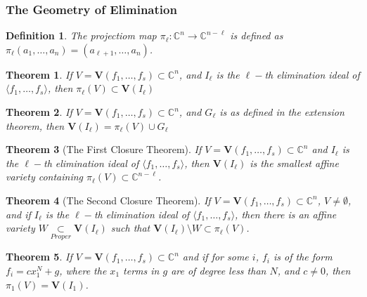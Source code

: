 \documentclass{article}
\theoremstyle{mystyle}
\newtheorem{theorem}{Theorem}[section]
\newtheorem{definition}{Definition}[section]
\begin{document}
\subsubsection{The Geometry of Elimination}
\begin{definition}
The projectiom map $\pi_{\ell}: \mathbb{C}^n \rightarrow \mathbb{C}^{n-\ell}$ is defined as $\pi_{\ell}(a_1,\hdots, a_n) = (a_{\ell+1},\hdots, a_n)$.
\end{definition}
\begin{theorem}
If $V=\mathbf{V}(f_1,\hdots, f_s) \subset \mathbb{C}^n$, and $I_{\ell}$ is the $\ell-$th elimination ideal of $\langle f_1,\hdots, f_s\rangle$, then $\pi_{\ell}(V) \subset \textbf{V}(I_{\ell})$
\end{theorem}
\begin{theorem}
If $V = \mathbf{V}(f_1,\hdots, f_s) \subset \mathbb{C}^n$, and $G_{\ell}$ is as defined in the extension theorem, then $\textbf{V}(I_{\ell}) = \pi_{\ell}(V)\cup G_{\ell}$
\end{theorem}
\begin{theorem}[The First Closure Theorem]
If $V = \mathbf{V}(f_1,\hdots, f_s) \subset \mathbb{C}^n$ and $I_{\ell}$ is the $\ell-$th elimination ideal of $\langle f_1,\hdots, f_s\rangle$, then $\textbf{V}(I_{\ell})$ is the smallest affine variety containing $\pi_{\ell}(V)\subset \mathbb{C}^{n-\ell}$.
\end{theorem}
\begin{theorem}[The Second Closure Theorem]
If $V = \mathbf{V}(f_1,\hdots, f_s) \subset \mathbb{C}^n$, $V\ne \emptyset$, and if $I_{\ell}$ is the $\ell-$th elimination ideal of $\langle f_1,\hdots, f_s\rangle$, then there is an affine variety $W\underset{Proper}{\subset} \textbf{V}(I_{\ell})$ such that $\textbf{V}(I_{\ell})\setminus W \subset \pi_{\ell}(V)$.
\end{theorem}
\begin{theorem}
If $V = \mathbf{V}(f_1,\hdots, f_s)\subset \mathbb{C}^n$ and if for some $i$, $f_i$ is of the form $f_i = cx_1^N + g$, where the $x_1$ terms in $g$ are of degree less than $N$, and $c\ne 0$, then $\pi_{1}(V) = \textbf{V}(I_{1})$.
\end{theorem}
\end{document}

